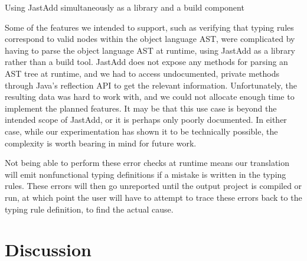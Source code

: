 \documentclass[nofilelist]{cslthse-msc}
\begin{document}
Using JastAdd simultaneously as a library and a build component

Some of the features we intended to support, such as verifying that typing rules correspond to valid nodes within the object language AST, were complicated by having to parse the object language AST at runtime, using JastAdd as a library rather than a build tool.
JastAdd does not expose any methods for parsing an AST tree at runtime, and we had to access undocumented, private methods through Java's reflection API to get the relevant information.
Unfortunately, the resulting data was hard to work with, and we could not allocate enough time to implement the planned features.
It may be that this use case is beyond the intended scope of JastAdd, or it is perhaps only poorly documented.
In either case, while our experimentation has shown it to be technically possible, the complexity is worth bearing in mind for future work.

Not being able to perform these error checks at runtime means our translation will emit nonfunctional typing definitions if a mistake is written in the typing rules.
These errors will then go unreported until the output project is compiled or run, at which point the user will have to attempt to trace these errors back to the typing rule definition, to find the actual cause.


\chapter{Discussion} %
\end{document}
